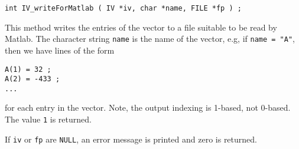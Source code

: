 \begin{enumerate}
\begin{verbatim}
int IV_writeForMatlab ( IV *iv, char *name, FILE *fp ) ;
\end{verbatim}
\par
This method writes the entries of the vector to a file
suitable to be read by Matlab.
The character string {\tt name} is the name of the vector,
e.g, if {\tt name = "A"}, then we have lines of the form
\begin{verbatim}
A(1) = 32 ;
A(2) = -433 ;
...
\end{verbatim}
for each entry in the vector.
Note, the output indexing is 1-based, not 0-based.
The value {\tt 1} is returned.
\par {}
If {\tt iv} or {\tt fp} are {\tt NULL},
an error message is printed and zero is returned.
\end{enumerate}

